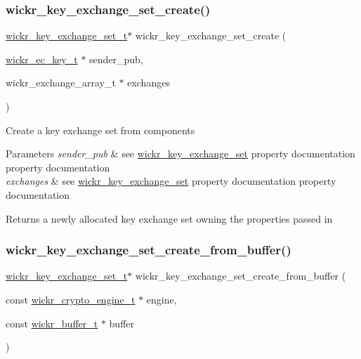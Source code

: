 \subsubsection{\texorpdfstring{wickr\+\_\+key\+\_\+exchange\+\_\+set\+\_\+create()}{wickr\_key\_exchange\_set\_create()}}
{\footnotesize\ttfamily \mbox{\hyperlink{structwickr__key__exchange__set}{wickr\+\_\+key\+\_\+exchange\+\_\+set\+\_\+t}}$\ast$ wickr\+\_\+key\+\_\+exchange\+\_\+set\+\_\+create (\begin{DoxyParamCaption}\item[{\mbox{\hyperlink{structwickr__ec__key}{wickr\+\_\+ec\+\_\+key\+\_\+t}} $\ast$}]{sender\+\_\+pub,  }\item[{wickr\+\_\+exchange\+\_\+array\+\_\+t $\ast$}]{exchanges }\end{DoxyParamCaption})}

Create a key exchange set from components


\begin{DoxyParams}{Parameters}
{\em sender\+\_\+pub} & see \textquotesingle{}\mbox{\hyperlink{structwickr__key__exchange__set}{wickr\+\_\+key\+\_\+exchange\+\_\+set}}\textquotesingle{} property documentation property documentation \\
\hline
{\em exchanges} & see \textquotesingle{}\mbox{\hyperlink{structwickr__key__exchange__set}{wickr\+\_\+key\+\_\+exchange\+\_\+set}}\textquotesingle{} property documentation property documentation \\
\hline
\end{DoxyParams}
\begin{DoxyReturn}{Returns}
a newly allocated key exchange set owning the properties passed in 
\end{DoxyReturn}
\mbox{\label{group__wickr__key__exchange__set_gaec93a83e2f00a707caf371b340591324}} 
\subsubsection{\texorpdfstring{wickr\+\_\+key\+\_\+exchange\+\_\+set\+\_\+create\+\_\+from\+\_\+buffer()}{wickr\_key\_exchange\_set\_create\_from\_buffer()}}
{\footnotesize\ttfamily \mbox{\hyperlink{structwickr__key__exchange__set}{wickr\+\_\+key\+\_\+exchange\+\_\+set\+\_\+t}}$\ast$ wickr\+\_\+key\+\_\+exchange\+\_\+set\+\_\+create\+\_\+from\+\_\+buffer (\begin{DoxyParamCaption}\item[{const \mbox{\hyperlink{structwickr__crypto__engine}{wickr\+\_\+crypto\+\_\+engine\+\_\+t}} $\ast$}]{engine,  }\item[{const \mbox{\hyperlink{structwickr__buffer}{wickr\+\_\+buffer\+\_\+t}} $\ast$}]{buffer }\end{DoxyParamCaption})}

